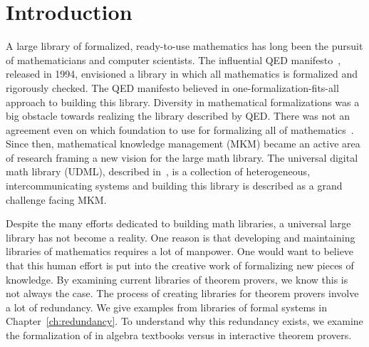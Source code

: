 \chapter{Introduction}
\label{ch:intro}

A large library of formalized, ready-to-use mathematics has long been the pursuit of mathematicians and computer scientists.  
The influential QED manifesto~\cite{boyer1994qed}, released in 1994, envisioned a library in which all mathematics is formalized and rigorously checked. The QED manifesto believed in one-formalization-fits-all approach to building this library.
Diversity in mathematical formalizations was a big obstacle towards realizing the library described by QED. There was not an agreement even on which foundation to use for formalizing all of mathematics~\cite{qedrealoaded2016}.  Since then, mathematical knowledge management (MKM) became an active area of research framing a new vision for the large math library. The universal digital math library (UDML), described in~\cite{farmer2004mkm}, is a collection of heterogeneous, intercommunicating systems and building this library is described as a grand challenge facing MKM. 

Despite the many efforts dedicated to building math libraries, a universal large library has not become a reality. One reason is that developing and maintaining libraries of mathematics requires a lot of manpower. One would want to believe that this human effort is put into the creative work of formalizing new pieces of knowledge. By examining current libraries of theorem provers, we know this is not always the case. The process of creating libraries for theorem provers involve a lot of redundancy. We give examples from libraries of formal systems in Chapter~\ref{ch:redundancy}. To understand why this redundancy exists, we examine the formalization of  in algebra textbooks versus in interactive theorem provers. 

